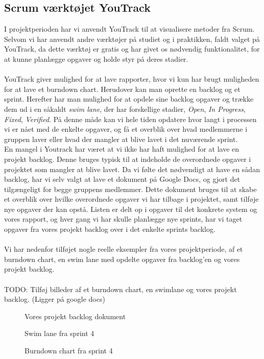 \subsection{Scrum værktøjet YouTrack}
I projektperioden har vi anvendt YouTrack til at visualisere metoder fra Scrum.
\\
Selvom vi har anvendt andre værktøjer på studiet og i praktikken, faldt valget på YouTrack, da dette værktøj er gratis og
har givet os nødvendig funktionalitet, for at kunne planlægge opgaver og holde styr på deres stadier.
\\\\
YouTrack giver mulighed for at lave rapporter, hvor vi kun har brugt muligheden for at lave et burndown chart. Herudover kan man oprette
en backlog og et sprint. Herefter har man mulighed for at opdele sine backlog opgaver og trække dem ud i en såkaldt \textit{swim lane}, der har forskellige
stadier, \textit{Open}, \textit{In Progress}, \textit{Fixed}, \textit{Verified}. På denne måde kan vi hele tiden opdatere hvor langt i processen vi er nået
med de enkelte opgaver, og få et overblik over hvad medlemmerne i gruppen laver eller hvad der mangler at blive lavet i det nuværende sprint.
\\
En mangel i Youtrack har været at vi ikke har haft mulighed for at lave en projekt backlog. Denne bruges typisk til at indeholde de overordnede opgaver i
projektet som mangler at blive lavet. Da vi følte det nødvendigt at have en sådan backlog, har vi selv valgt at lave et dokument på Google Docs, og gjort det tilgængeligt
for begge gruppens medlemmer. Dette dokument bruges til at skabe et overblik over hvilke overordnede opgaver vi har tilbage i projektet, samt tilføje nye opgaver der kan opstå.
Listen er delt op i opgaver til det konkrete system og vores rapport, og hver gang vi har skulle planlægge nye sprints, har vi taget opgaver fra vores projekt backlog over i
det enkelte sprints backlog.
\\\\
Vi har nedenfor tilføjet nogle reelle eksempler fra vores projektperiode, af et burndown chart, en swim lane med opdelte opgaver fra backlog'en og vores projekt backlog.
\\\\
TODO: Tilføj billeder af et burndown chart, en swimlane og vores projekt backlog. (Ligger på google docs)
\begin{figure}[here]
    \caption{Vores projekt backlog dokument}
    \label{fig:projekt-backlog}
\end{figure}
\begin{figure}[here]
    \caption{Swim lane fra sprint 4}
    \label{fig:swim-lane}
\end{figure}
\begin{figure}[here]
    \caption{Burndown chart fra sprint 4}
    \label{fig:burndown-chart}
\end{figure}
